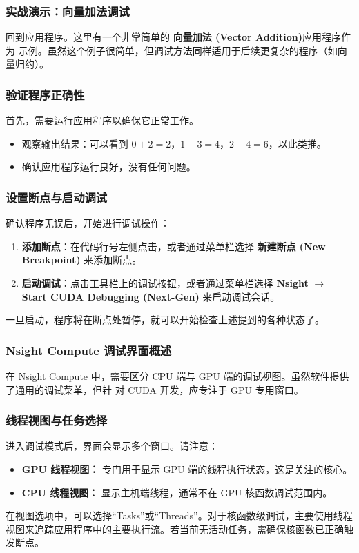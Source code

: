 \subsubsection{实战演示：向量加法调试}
回到应用程序。这里有一个非常简单的 \textbf{向量加法 (Vector Addition)}应用程序作为
示例。虽然这个例子很简单，但调试方法同样适用于后续更复杂的程序（如向量归约）。

\subsubsection{验证程序正确性}
首先，需要运行应用程序以确保它正常工作。
\begin{itemize}
    \item 观察输出结果：可以看到 $0 + 2 = 2$，$1 + 3 = 4$，$2 + 4 = 6$，以此类推。
    \item 确认应用程序运行良好，没有任何问题。
\end{itemize}

\subsubsection{设置断点与启动调试}
确认程序无误后，开始进行调试操作：
\begin{enumerate}
    \item \textbf{添加断点}：在代码行号左侧点击，或者通过菜单栏选择 \textbf{新建断点 (New Breakpoint)} 来添加断点。
    \item \textbf{启动调试}：点击工具栏上的调试按钮，或者通过菜单栏选择 \textbf{Nsight} $\rightarrow$ \textbf{Start CUDA Debugging (Next-Gen)} 来启动调试会话。
\end{enumerate}

一旦启动，程序将在断点处暂停，就可以开始检查上述提到的各种状态了。



\subsubsection{Nsight Compute 调试界面概述}
在 Nsight Compute 中，需要区分 CPU 端与 GPU 端的调试视图。虽然软件提供了通用的调试菜单，但针
对 CUDA 开发，应专注于 GPU 专用窗口。

\subsubsection{线程视图与任务选择}
进入调试模式后，界面会显示多个窗口。请注意：
\begin{itemize}
    \item \textbf{GPU 线程视图：} 专门用于显示 GPU 端的线程执行状态，这是关注的核心。
    \item \textbf{CPU 线程视图：} 显示主机端线程，通常不在 GPU 核函数调试范围内。
\end{itemize}
在视图选项中，可以选择“Tasks”或“Threads”。对于核函数级调试，主要使用线程视图来追踪应用程序中的主要执行流。若当前无活动任务，需确保核函数已正确触发断点。

